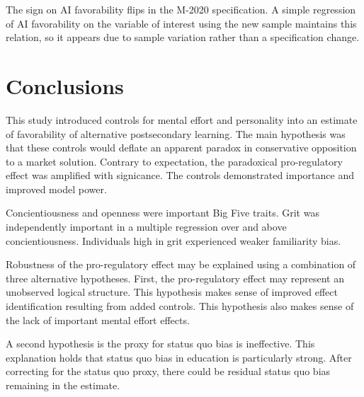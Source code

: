 \documentclass[review]{elsarticle}
\begin{document}

The sign on AI favorability flips in the M-2020 specification.
A simple regression of AI favorability on the variable of interest using the new sample maintains this relation,
so it appears due to sample variation rather than a specification change.

\section{Conclusions}

This study introduced controls for mental effort and personality into an estimate of favorability of alternative postsecondary learning.
The main hypothesis was that these controls would deflate an apparent paradox in conservative opposition to a market solution.
Contrary to expectation, the paradoxical pro-regulatory effect was amplified with signicance.
The controls demonstrated importance and improved model power.

Concientiousness and openness were important Big Five traits.
Grit was independently important in a multiple regression over and above concientiousness.
Individuals high in grit experienced weaker familiarity bias.


Robustness of the pro-regulatory effect may be explained using a combination of three alternative hypotheses.
First, the pro-regulatory effect may represent an unobserved logical structure.
This hypothesis makes sense of improved effect identification resulting from added controls.
This hypothesis also makes sense of the lack of important mental effort effects.


A second hypothesis is the proxy for status quo bias is ineffective.
This explanation holds that status quo bias in education is particularly strong.
After correcting for the status quo proxy, there could be residual status quo bias remaining in the estimate.
\end{document}
